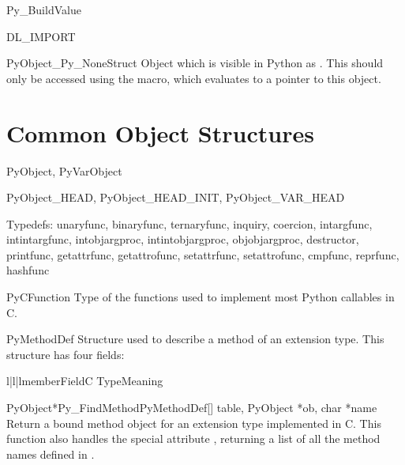 \documentclass{manual}
\begin{document}
Py_BuildValue

DL_IMPORT

\begin{cvardesc}{PyObject}{_Py_NoneStruct}
  Object which is visible in Python as .  This should only
  be accessed using the  macro, which evaluates to a
  pointer to this object.
\end{cvardesc}


\section{Common Object Structures \label{common-structs}}

PyObject, PyVarObject

PyObject_HEAD, PyObject_HEAD_INIT, PyObject_VAR_HEAD

Typedefs:
unaryfunc, binaryfunc, ternaryfunc, inquiry, coercion, intargfunc,
intintargfunc, intobjargproc, intintobjargproc, objobjargproc,
destructor, printfunc, getattrfunc, getattrofunc, setattrfunc,
setattrofunc, cmpfunc, reprfunc, hashfunc

\begin{ctypedesc}{PyCFunction}
Type of the functions used to implement most Python callables in C.
\end{ctypedesc}

\begin{ctypedesc}{PyMethodDef}
Structure used to describe a method of an extension type.  This
structure has four fields:

\begin{tableiii}{l|l|l}{member}{Field}{C Type}{Meaning}
\end{tableiii}
\end{ctypedesc}

\begin{cfuncdesc}{PyObject*}{Py_FindMethod}{PyMethodDef[] table,
                                            PyObject *ob, char *name}
Return a bound method object for an extension type implemented in C.
This function also handles the special attribute ,
returning a list of all the method names defined in .
\end{cfuncdesc}
\end{document}
